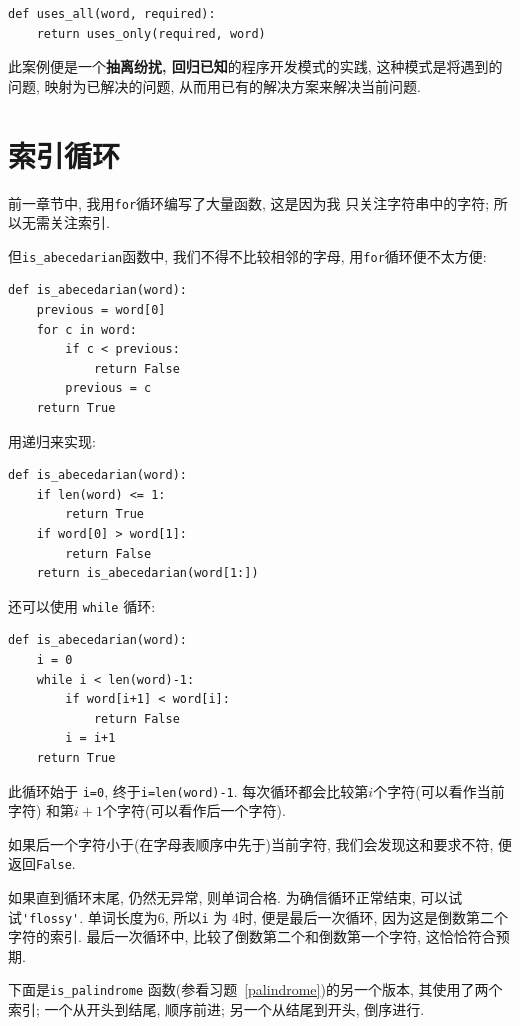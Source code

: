 \documentclass[10pt]{book}
\begin{document}
\begin{verbatim}
def uses_all(word, required):
    return uses_only(required, word)
\end{verbatim}
%
此案例便是一个{\bf 抽离纷扰, 回归已知}的程序开发模式的实践, 
这种模式是将遇到的问题, 映射为已解决的问题, 
从而用已有的解决方案来解决当前问题.   


\section{索引循环}
前一章节中, 我用{\tt for}循环编写了大量函数, 这是因为我
只关注字符串中的字符; 所以无需关注索引. 

但\verb"is_abecedarian"函数中, 我们不得不比较相邻的字母, 
用{\tt for}循环便不太方便:

\begin{verbatim}
def is_abecedarian(word):
    previous = word[0]
    for c in word:
        if c < previous:
            return False
        previous = c
    return True
\end{verbatim}

用递归来实现:

\begin{verbatim}
def is_abecedarian(word):
    if len(word) <= 1:
        return True
    if word[0] > word[1]:
        return False
    return is_abecedarian(word[1:])
\end{verbatim}

还可以使用 {\tt while} 循环:

\begin{verbatim}
def is_abecedarian(word):
    i = 0
    while i < len(word)-1:
        if word[i+1] < word[i]:
            return False
        i = i+1
    return True
\end{verbatim}
%
此循环始于 {\tt i=0}, 终于{\tt i=len(word)-1}. 
每次循环都会比较第$i$个字符(可以看作当前字符)
和第$i+1$个字符(可以看作后一个字符). 

如果后一个字符小于(在字母表顺序中先于)当前字符, 
我们会发现这和要求不符, 便返回{\tt False}.

如果直到循环末尾, 仍然无异常, 则单词合格. 
为确信循环正常结束, 可以试试\verb"'flossy'". 
单词长度为6, 所以{\tt i} 为 4时, 便是最后一次循环, 
因为这是倒数第二个字符的索引. 最后一次循环中, 
比较了倒数第二个和倒数第一个字符, 这恰恰符合预期. 

下面是\verb"is_palindrome" 函数(参看习题~\ref{palindrome})的另一个版本, 
其使用了两个索引; 一个从开头到结尾, 顺序前进;
另一个从结尾到开头, 倒序进行.
\end{document}
